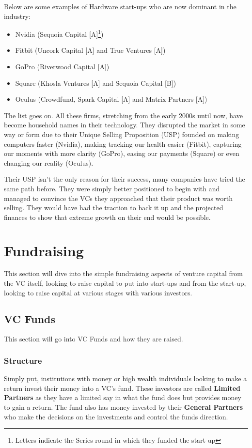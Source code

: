 \documentclass[a4paper]{article}
\begin{document}
{\vspace{5pt}
\noindent Below are some examples of Hardware start-ups who are now dominant in the industry:
\begin{itemize}
	\item Nvidia (Sequoia Capital [A]\footnote{Letters indicate the Series round in which they funded the start-up})
	\item Fitbit (Uncork Capital [A] and True Ventures [A])
	\item GoPro (Riverwood Capital [A])
	\item Square (Khosla Ventures [A] and Sequoia Capital [B])
	\item Oculus (Crowdfund, Spark Capital [A] and Matrix Partners [A])
\end{itemize}
\vspace{5pt}
The list goes on. All these firms, stretching from the early 2000s until now, have become household names in their technology. They disrupted the market in some way or form due to their Unique Selling Proposition (USP) founded on making computers faster (Nvidia), making tracking our health easier (Fitbit), capturing our moments with more clarity (GoPro), easing our payments (Square) or even changing our reality (Oculus).

\vspace{5pt}
\noindent Their USP isn't the only reason for their success, many companies have tried the same path before. They were simply better positioned to begin with and managed to convince the VCs they approached that their product was worth selling. They would have had the traction to back it up and the projected finances to show that extreme growth on their end would be possible.

\newpage
\section{Fundraising}
This section will dive into the simple fundraising aspects of venture capital from the VC itself, looking to raise capital to put into start-ups and from the start-up, looking to raise capital at various stages with various investors.

\subsection{VC Funds}
This section will go into VC Funds and how they are raised.

\subsubsection{Structure}
Simply put, institutions with money or high wealth individuals looking to make a return invest their money into a VC's fund. These investors are called \textbf{Limited Partners} as they have a limited say in what the fund does but provides money to gain a return. The fund also has money invested by their \textbf{General Partners} who make the decisions on the investments and control the funds direction.

}
\end{document}

